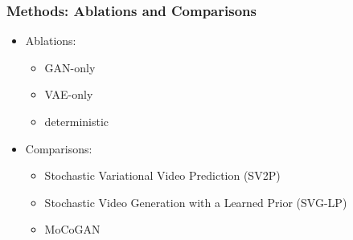 \documentclass{article}
\begin{document}
    \subsubsection{Methods: Ablations and Comparisons}\label{subsubsec:Stochastic_Adversarial_Video_Prediction_(SAVP):ablations}
    \begin{itemize}
        \item Ablations:
        \begin{itemize}
            \item GAN-only
            \item VAE-only
            \item deterministic
        \end{itemize}
        \item Comparisons:
        \begin{itemize}
            \item Stochastic Variational Video Prediction (SV2P)
            \item Stochastic Video Generation with a Learned Prior (SVG-LP)
            \item MoCoGAN
        \end{itemize}
    \end{itemize}
\end{document}
